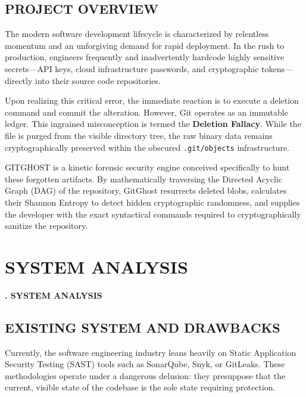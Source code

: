 \documentclass[12pt, a4paper, oneside]{report}
\begin{document}
\section{PROJECT OVERVIEW}
The modern software development lifecycle is characterized by relentless momentum and an unforgiving demand for rapid deployment. In the rush to production, engineers frequently and inadvertently hardcode highly sensitive secrets---API keys, cloud infrastructure passwords, and cryptographic tokens---directly into their source code repositories. 

Upon realizing this critical error, the immediate reaction is to execute a deletion command and commit the alteration. However, Git operates as an immutable ledger. This ingrained misconception is termed the \textbf{Deletion Fallacy}. While the file is purged from the visible directory tree, the raw binary data remains cryptographically preserved within the obscured \texttt{.git/objects} infrastructure.

GITGHOST is a kinetic forensic security engine conceived specifically to hunt these forgotten artifacts. By mathematically traversing the Directed Acyclic Graph (DAG) of the repository, GitGhost resurrects deleted blobs, calculates their Shannon Entropy to detect hidden cryptographic randomness, and supplies the developer with the exact syntactical commands required to cryptographically sanitize the repository.

\chapter{SYSTEM ANALYSIS}
\begin{center}
    {\Large \textbf{\thechapter. SYSTEM ANALYSIS} \par}
\end{center}
\vspace{1cm}

\section{EXISTING SYSTEM AND DRAWBACKS}
Currently, the software engineering industry leans heavily on Static Application Security Testing (SAST) tools such as SonarQube, Snyk, or GitLeaks. These methodologies operate under a dangerous delusion: they presuppose that the current, visible state of the codebase is the sole state requiring protection.
\end{document}

